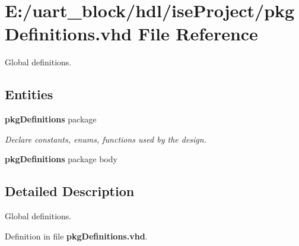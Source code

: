 \section{E\-:/uart\-\_\-block/hdl/ise\-Project/pkg\-Definitions.vhd File Reference}
\label{pkg_definitions_8vhd}


Global definitions.  


\subsection*{Entities}
\begin{DoxyCompactItemize}
\item 
{\bfseries pkg\-Definitions} package
\begin{DoxyCompactList}\small\item\em Declare constants, enums, functions used by the design. \end{DoxyCompactList}\item 
{\bf pkg\-Definitions} package body
\end{DoxyCompactItemize}


\subsection{Detailed Description}
Global definitions. 

Definition in file {\bf pkg\-Definitions.\-vhd}.

